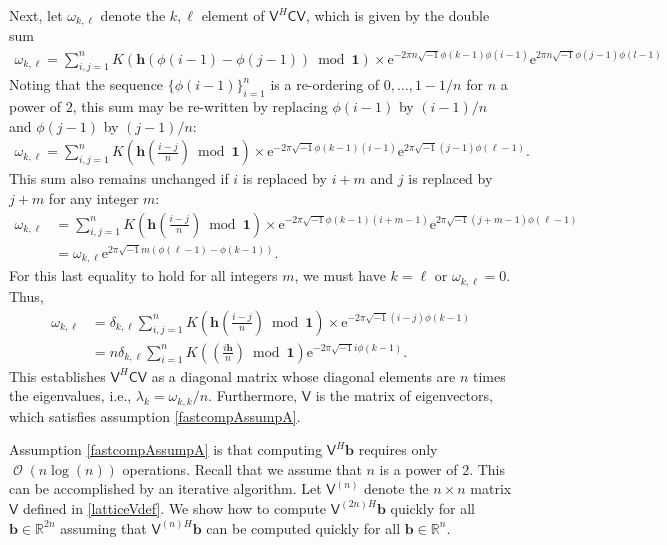 \documentclass{iitthesis}          %
\DeclareMathOperator{\Order}{{\mathcal O}}
\newcommand{\bm}[1]{\boldsymbol{#1}}
\newcommand{\reals}{\mathbb{R}}
\newcommand{\vb}{\bm{b}}
\newcommand{\vh}{\bm{h}}
\newcommand{\vone}{\bm{1}}
\newcommand{\mC}{\mathsf{C}}
\newcommand{\mV}{\mathsf{V}}
\newcommand{\me}{\mathrm{e}}
\begin{document}
Next, let $\omega_{k, \ell}$ denote the $k,\ell$ element of $\mV^H \mC \mV$, which is given by the double sum
\begin{align*}
\omega_{k, \ell} = \sum_{i,j=1}^n K(\vh(\phi(i-1) - \phi(j-1)) \bmod \vone ) 
\times   \me^{-2 \pi n \sqrt{-1} \phi(k-1)\phi(i-1)}  \me^{2 \pi n \sqrt{-1} \phi(j-1)\phi(l-1)}
\end{align*}
Noting that the sequence $\{\phi(i-1)\}_{i=1}^n$ is a re-ordering of $0, \ldots, 1-1/n$ for $n$ a power of $2$, this sum may be re-written by replacing $\phi(i-1)$ by $(i-1)/n$ and $\phi(j-1)$ by $(j-1)/n$:
\begin{align*}
\omega_{k, \ell} = \sum_{i,j=1}^n K\left (\vh \left(\frac{i-j}{n} \right) \bmod \vone \right) 
\times   \me^{-2 \pi \sqrt{-1} \phi(k-1)(i-1)}  \me^{2 \pi \sqrt{-1} (j-1)\phi(\ell-1)}.
\end{align*}
This sum also remains unchanged if $i$ is replaced by $i+m$ and $j$ is replaced by $j+m$ for any integer $m$:
\begin{align*}
\omega_{k, \ell} &= \sum_{i,j=1}^n K\left (\vh \left(\frac{i-j}{n} \right) \bmod \vone \right) 
\times   \me^{-2 \pi \sqrt{-1} \phi(k-1)(i+m-1)}  \me^{2 \pi \sqrt{-1} (j+m-1)\phi(\ell-1)} \\
 &=   \omega_{k, \ell}  \me^{2 \pi \sqrt{-1} m(\phi(\ell-1) - \phi(k-1))}.
\end{align*}
For this last equality to hold for all integers $m$, we must have $k = \ell$ or $\omega_{k,\ell} = 0$.  Thus, 
\begin{align*}
\omega_{k, \ell} &= \delta_{k,\ell} \sum_{i,j=1}^n K\left (\vh \left(\frac{i-j}{n} \right) \bmod \vone \right) \times   \me^{-2 \pi \sqrt{-1} (i - j) \phi(k-1)} \\
& = n \delta_{k,\ell}  \sum_{i=1}^n K\left ( \left(\frac{i\vh}{n} \right) \bmod \vone \right)  \me^{-2 \pi \sqrt{-1} i \phi(k-1) }.
\end{align*}
This establishes $\mV^H \mC \mV$ as a diagonal matrix whose diagonal elements are $n$ times the eigenvalues, i.e., $\lambda_k = \omega_{k,k}/n$.  Furthermore, $\mV$ is the matrix of eigenvectors, which satisfies assumption \eqref{fastcompAssumpA}.

Assumption \eqref{fastcompAssumpA} is that computing $\mV^H \vb$ requires only $\Order(n \log(n)) $ operations.  Recall that we assume that $n$ is a power of $2$.  This can be accomplished by an iterative algorithm.  Let $\mV^{(n)}$ denote the $n \times n$ matrix $\mV$ defined in  \eqref{latticeVdef}.  We show how to compute $\mV^{(2n)H}\vb$ quickly for all $\vb \in \reals^{2n}$ assuming that $\mV^{(n)H}\vb$ can be computed quickly for all $\vb \in \reals^n$.
\end{document}
